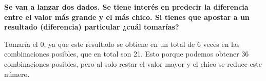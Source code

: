 \item \textbf{Se van a lanzar dos dados. Se tiene interés en predecir la diferencia entre el valor más grande y el más chico. Si tienes que apostar a un resultado (diferencia) particular ¿cuál tomarías?}

Tomaría el 0, ya que este resultado se obtiene en un total de 6 veces en las combinaciones posibles, que en total son 21. Esto porque podemos obtener 36 combinaciones posibles, pero al solo restar el valor mayor y el chico se reduce este número.